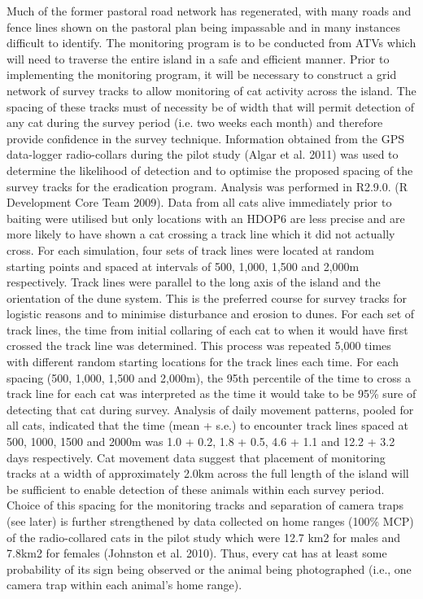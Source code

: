 \documentclass[version=last,
    paper=a4,                               %
    10pt,                                   %
    dvipsnames,
    oneside,                              %
    headings=openany,                       %
    open=any,
    BCOR=7mm,                               %
    DIV=15,     %
]{scrbook}
\begin{document}
Much of the former pastoral road network has regenerated, with many
roads and fence lines shown on the pastoral plan being impassable and in
many instances difficult to identify. The monitoring program is to be
conducted from ATVs which will need to traverse the entire island in a
safe and efficient manner. Prior to implementing the monitoring program,
it will be necessary to construct a grid network of survey tracks to
allow monitoring of cat activity across the island. The spacing of these
tracks must of necessity be of width that will permit detection of any
cat during the survey period (i.e. two weeks each month) and therefore
provide confidence in the survey technique. Information obtained from
the GPS data-logger radio-collars during the pilot study (Algar et al.
2011) was used to determine the likelihood of detection and to optimise
the proposed spacing of the survey tracks for the eradication program.
Analysis was performed in R2.9.0. (R Development Core Team 2009). Data
from all cats alive immediately prior to baiting were utilised but only
locations with an HDOP6 are less precise and are more likely to have
shown a cat crossing a track line which it did not actually cross. For
each simulation, four sets of track lines were located at random
starting points and spaced at intervals of 500, 1,000, 1,500 and 2,000m
respectively. Track lines were parallel to the long axis of the island
and the orientation of the dune system. This is the preferred course for
survey tracks for logistic reasons and to minimise disturbance and
erosion to dunes. For each set of track lines, the time from initial
collaring of each cat to when it would have first crossed the track line
was determined. This process was repeated 5,000 times with different
random starting locations for the track lines each time. For each
spacing (500, 1,000, 1,500 and 2,000m), the 95th percentile of the time
to cross a track line for each cat was interpreted as the time it would
take to be 95\% sure of detecting that cat during survey. Analysis of
daily movement patterns, pooled for all cats, indicated that the time
(mean + s.e.) to encounter track lines spaced at 500, 1000, 1500 and
2000m was 1.0 + 0.2, 1.8 + 0.5, 4.6 + 1.1 and 12.2 + 3.2 days
respectively. Cat movement data suggest that placement of monitoring
tracks at a width of approximately 2.0km across the full length of the
island will be sufficient to enable detection of these animals within
each survey period. Choice of this spacing for the monitoring tracks and
separation of camera traps (see later) is further strengthened by data
collected on home ranges (100\% MCP) of the radio-collared cats in the
pilot study which were 12.7 km2 for males and 7.8km2 for females
(Johnston et al. 2010). Thus, every cat has at least some probability of
its sign being observed or the animal being photographed (i.e., one
camera trap within each animal's home range).
\end{document}
